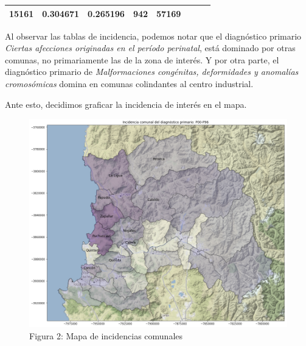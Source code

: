 \documentclass[]{article}
\begin{document}
\begin{longtable}[]{@{}llllllll@{}}
\begin{minipage}[t]{0.13\columnwidth}
15161\strut
\end{minipage} & \begin{minipage}[t]{0.10\columnwidth}\raggedright
0.304671\strut
\end{minipage} & \begin{minipage}[t]{0.09\columnwidth}\raggedright
0.265196\strut
\end{minipage} & \begin{minipage}[t]{0.10\columnwidth}\raggedright
942\strut
\end{minipage} & \begin{minipage}[t]{0.10\columnwidth}\raggedright
57169\strut
\end{minipage}\tabularnewline
\bottomrule
\end{longtable}

Al observar las tablas de incidencia, podemos notar que el diagnóstico
primario \emph{Ciertas afecciones originadas en el período perinatal},
está dominado por otras comunas, no primariamente las de la zona de
interés. Y por otra parte, el diagnóstico primario de
\emph{Malformaciones congénitas, deformidades y anomalías cromosómicas}
domina en comunas colindantes al centro industrial.

Ante esto, decidimos graficar la incidencia de interés en el mapa.

\begin{figure}
\centering
\includegraphics{assets/mapa.png}
\caption{Figura 2: Mapa de incidencias comunales}
\end{figure}
\end{document}
